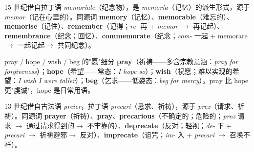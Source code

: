 \documentclass[../main.tex]{subfiles}
\begin{document}


\begin{origin}
15 世纪借自拉丁语 \textit{memoriale}（纪念物），是 \textit{memoria}（记忆）的派生形式，源于 \textit{memor}（记在心里的）。同源词 \textbf{memory}（记忆）、\textbf{memorable}（难忘的）、\textbf{memorise}（记住）、\textbf{remember}（记得；\textit{re-} 再 + \textit{memor} $\to$ 再记起）、\textbf{remembrance}（纪念；回忆）、\textbf{commemorate}（纪念；\textit{com-} 一起 + memorare $\to$ 一起记起$\to$ 共同纪念）。
\end{origin}




\begin{gram}{pray / hope / wish / beg 的"愿"细分}
\textbf{pray}（祈祷——多含宗教意涵：\textit{pray for forgiveness}）；\textbf{hope}（希望——常态：\textit{I hope so}）；\textbf{wish}（祝愿；难以实现的希望：\textit{I wish I were taller}）；\textbf{beg}（乞求——低姿态：\textit{beg for mercy}）。pray 比 hope 更"虔诚"，hope 是日常用语。
\end{gram}

\begin{origin}
13 世纪借自古法语 \textit{preier}，拉丁语 \textit{precari}（恳求、祈祷），源于 \textit{prex}（请求、祈祷）。同源词 \textbf{prayer}（祈祷）、\textbf{pray}、\textbf{precarious}（不确定的；危险的；\textit{prex} 请求 $\to$ 通过请求得到的$\to$ 不牢靠的）、\textbf{deprecate}（反对；轻视；\textit{de-} 下 + \textit{precari} $\to$ 祈祷避邪$\to$ 反对）、\textbf{imprecate}（诅咒；\textit{im-} 入 + \textit{precari} $\to$ 召唤不祥）。
\end{origin}


\end{document}
